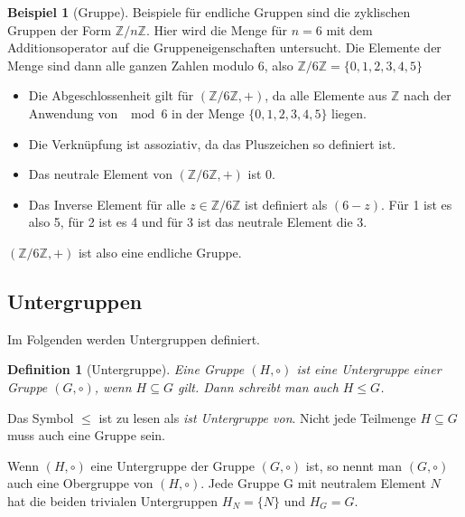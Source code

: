 \documentclass[12pt,a4paper, usenames, dvipsnames]{article}
\theoremstyle{mystyle}
\newtheorem{definition}{Definition}
\theoremstyle{definition}
\newtheorem{bsp}{Beispiel}[definition]
\begin{document}
\begin{bsp}[Gruppe]

Beispiele für endliche Gruppen sind die zyklischen Gruppen der Form $\mathbb{Z}/n\mathbb{Z}$. Hier wird die Menge für $n=6$ mit dem Additionsoperator auf die Gruppeneigenschaften untersucht. Die Elemente der Menge sind dann alle ganzen Zahlen modulo 6, also $\mathbb{Z}/6\mathbb{Z}=\{0,1,2,3,4,5\}$
\begin{itemize}
\item Die Abgeschlossenheit gilt für $(\mathbb{Z}/6\mathbb{Z}, +)$, da alle Elemente aus $\mathbb{Z}$ nach der Anwendung von $\mod 6$ in der Menge $\{0,1,2,3,4,5\}$ liegen.
\item Die Verknüpfung ist assoziativ, da das Pluszeichen so definiert ist.
\item Das neutrale Element von $(\mathbb{Z}/6\mathbb{Z}, +)$ ist $0$.
\item Das Inverse Element für alle $z \in \mathbb{Z}/6\mathbb{Z}$ ist definiert als $(6-z)$. Für 1 ist es also 5, für 2 ist es 4 und für 3 ist das neutrale Element die 3.
\end{itemize}

$(\mathbb{Z}/6\mathbb{Z}, +)$ ist also eine endliche Gruppe.

\end{bsp}

%
%
%
%
%
%
%
%
%
%
\subsection*{Untergruppen} 

Im Folgenden werden Untergruppen definiert.


\begin{definition}[Untergruppe]
Eine Gruppe $(H, \circ)$ ist eine Untergruppe einer Gruppe $(G, \circ)$, wenn $H \subseteq G$ gilt. Dann schreibt man auch $H \leqslant G$. 
\end{definition}

Das Symbol $\leqslant$ ist zu lesen als \textit{ist Untergruppe von}. Nicht jede Teilmenge $H \subseteq G$ muss auch eine Gruppe sein.

Wenn $(H, \circ)$ eine Untergruppe der Gruppe $(G, \circ)$ ist, so nennt man $(G, \circ)$ auch eine Obergruppe von $(H, \circ)$.
Jede Gruppe G mit neutralem Element $N$ hat die beiden trivialen Untergruppen ${H_N = \{N\}}$ und $H_G=G$.
\end{document}
